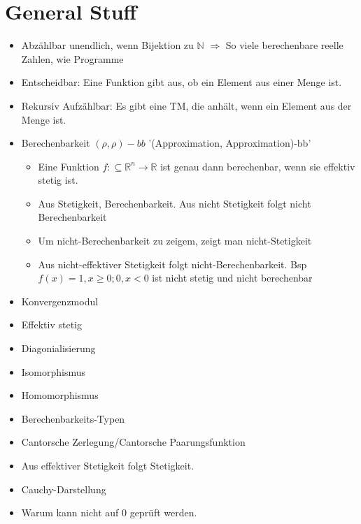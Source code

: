 \documentclass[ngerman]{scrartcl}
\begin{document}
\section{General Stuff}
\begin{itemize}
  \item Abzählbar unendlich, wenn Bijektion zu $ \mathbb{N} $ $ \Rightarrow $ So viele berechenbare reelle Zahlen, wie Programme
  \item Entscheidbar: Eine Funktion gibt aus, ob ein Element aus einer Menge ist.
  \item Rekursiv Aufzählbar: Es gibt eine TM, die anhält, wenn ein Element aus der Menge ist.
  \item Berechenbarkeit $ (\rho, \rho)-bb $ '(Approximation, Approximation)-bb'
  \begin{itemize}
    \item Eine Funktion $ f: \subseteq \mathbb{R}^n \rightarrow \mathbb{R} $ ist genau dann berechenbar, wenn sie effektiv stetig ist.
    \item Aus Stetigkeit, Berechenbarkeit. Aus nicht Stetigkeit folgt nicht Berechenbarkeit
    \item Um nicht-Berechenbarkeit zu zeigem, zeigt man nicht-Stetigkeit 
    \item Aus nicht-effektiver Stetigkeit folgt nicht-Berechenbarkeit. Bsp $  f(x) = 1, x \geq 0; 0, x < 0 $ ist nicht stetig und nicht berechenbar
  \end{itemize}
  \item Konvergenzmodul
  \item Effektiv stetig
  \item Diagonialisierung
  \item Isomorphismus
  \item Homomorphismus
  \item Berechenbarkeits-Typen
  \item Cantorsche Zerlegung/Cantorsche Paarungsfunktion
  \item Aus effektiver Stetigkeit folgt Stetigkeit. 
  \item Cauchy-Darstellung
  \item Warum kann nicht auf 0 geprüft werden.
\end{itemize}
\end{document}
